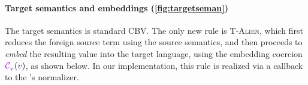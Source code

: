 %
%

\paragraph{\bf Target semantics and embeddings (\autoref{fig:targetseman})}
The target semantics is standard
 CBV.
 The only new rule is \textsc{T-Alien}, which first reduces the foreign
 source term using  the source semantics, and then proceeds
 to \emph{embed} the resulting value into the target
 language, using the embedding coercion $\tcoerce\stau\relax\sval$,
 as shown below. In our implementation, this rule is realized via a callback
 to the \fstar's normalizer.

